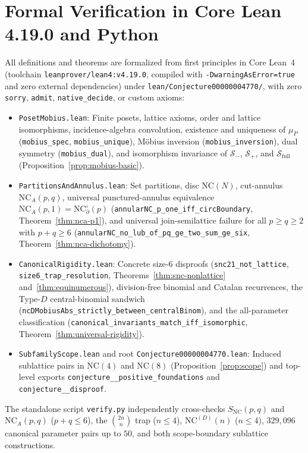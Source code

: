 \documentclass[11pt]{article}
\theoremstyle{definition}
\newcommand{\NC}{\mathrm{NC}}
\newcommand{\NCA}{\mathrm{NC}_A}
\newcommand{\SNC}{S_{\mathrm{NC}}}
\newcommand{\NCD}{\mathrm{NC}^{(D)}}
\begin{document}
\section{Formal Verification in Core Lean 4.19.0 and Python}

All definitions and theorems are formalized from first principles in Core Lean~4 (toolchain \texttt{leanprover/\allowbreak lean4:\allowbreak v4.19.0}, compiled with \texttt{-DwarningAsError=true} and zero external dependencies) under \texttt{lean/\allowbreak Conjecture00000004770/}, with zero \texttt{sorry}, \texttt{admit}, \texttt{native\_decide}, or custom axioms:
{\sloppy{}
\begin{itemize}
  \item \texttt{PosetMobius.lean}: Finite posets, lattice axioms, order and lattice isomorphisms, incidence-algebra convolution, existence and uniqueness of $\mu_P$ (\texttt{mobius\_spec}, \texttt{mobius\_unique}), M\"obius inversion (\texttt{mobius\_\allowbreak inversion}), dual symmetry (\texttt{mobius\_dual}), and isomorphism invariance of $\mathcal{S}_-$, $\mathcal{S}_+$, and $\mathcal{S}_{\mathrm{full}}$ (Proposition~\ref{prop:mobius-basic}).
  \item \texttt{PartitionsAndAnnulus.lean}: Set partitions, disc $\NC(N)$, cut-annulus $\NCA(p,q)$, universal punctured-annulus equivalence $\NCA(p,1) = \NC_\partial^\circ(p)$ (\texttt{annularNC\_\allowbreak p\_\allowbreak one\_\allowbreak iff\_\allowbreak circBoundary}, Theorem~\ref{thm:nca-p1}), and universal join-semilattice failure for all $p \ge q \ge 2$ with $p+q \ge 6$ (\texttt{annularNC\_\allowbreak no\_\allowbreak lub\_\allowbreak of\_\allowbreak pq\_\allowbreak ge\_\allowbreak two\_\allowbreak sum\_\allowbreak ge\_\allowbreak six}, Theorem~\ref{thm:nca-dichotomy}).
  \item \texttt{CanonicalRigidity.lean}: Concrete size-$6$ disproofs (\texttt{snc21\_\allowbreak not\_\allowbreak lattice}, \texttt{size6\_\allowbreak trap\_\allowbreak resolution}, Theorems~\ref{thm:snc-nonlattice} and~\ref{thm:equinumerous}), division-free binomial and Catalan recurrences, the Type-$D$ central-binomial sandwich (\texttt{ncDMobius\allowbreak Abs\_\allowbreak strictly\_\allowbreak between\_\allowbreak central\allowbreak Binom}), and the all-parameter classification (\texttt{canonical\_\allowbreak invariants\_\allowbreak match\_\allowbreak iff\_\allowbreak isomorphic}, Theorem~\ref{thm:universal-rigidity}).
  \item \texttt{SubfamilyScope.lean} and root \texttt{Conjecture00000004770.lean}: Induced sublattice pairs in $\NC(4)$ and $\NC(8)$ (Proposition~\ref{prop:scope}) and top-level exports \texttt{conjecture\_\_\allowbreak positive\_\allowbreak foundations} and \texttt{conjecture\_\_\allowbreak disproof}.
\end{itemize}
}
The standalone script \texttt{verify.py} independently cross-checks $\SNC(p,q)$ and $\NCA(p,q)$ ($p+q \le 6$), the $\binom{2n}{n}$ trap ($n \le 4$), $\NCD(n)$ ($n \le 4$), $329{,}096$ canonical parameter pairs up to $50$, and both scope-boundary sublattice constructions.
\end{document}
